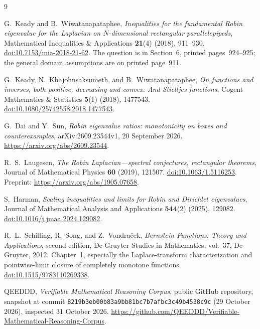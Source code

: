\documentclass[11pt,a4paper]{article}
\theoremstyle{definition}\newtheorem{definition}[theorem]{Definition}
\theoremstyle{remark}\newtheorem{remark}[theorem]{Remark}
\begin{document}
\begin{thebibliography}{9}

G.~Keady and B.~Wiwatanapataphee,
\emph{Inequalities for the fundamental Robin eigenvalue for the
Laplacian on $N$-dimensional rectangular parallelepipeds},
Mathematical Inequalities \& Applications \textbf{21}(4) (2018),
911--930.
\href{https://doi.org/10.7153/mia-2018-21-62}{doi:10.7153/mia-2018-21-62}.
The question is in Section~6, printed pages~924--925; the
general domain assumptions are on printed page~911.

G.~Keady, N.~Khajohnsaksumeth, and B.~Wiwatanapataphee,
\emph{On functions and inverses, both positive, decreasing and
convex: And Stieltjes functions},
Cogent Mathematics \& Statistics \textbf{5}(1) (2018), 1477543.
\href{https://doi.org/10.1080/25742558.2018.1477543}{doi:10.1080/25742558.2018.1477543}.

G.~Dai and Y.~Sun,
\emph{Robin eigenvalue ratios: monotonicity on boxes and counterexamples},
arXiv:2609.23544v1, 20 September 2026.
\url{https://arxiv.org/abs/2609.23544}.

R.~S.~Laugesen,
\emph{The Robin Laplacian---spectral conjectures, rectangular theorems},
Journal of Mathematical Physics \textbf{60} (2019), 121507.
\href{https://doi.org/10.1063/1.5116253}{doi:10.1063/1.5116253}.
Preprint: \url{https://arxiv.org/abs/1905.07658}.

S.~Harman,
\emph{Scaling inequalities and limits for Robin and Dirichlet eigenvalues},
Journal of Mathematical Analysis and Applications \textbf{544}(2)
(2025), 129082.
\href{https://doi.org/10.1016/j.jmaa.2024.129082}{doi:10.1016/j.jmaa.2024.129082}.

R.~L.~Schilling, R.~Song, and Z.~Vondra\v{c}ek,
\emph{Bernstein Functions: Theory and Applications}, second edition,
De Gruyter Studies in Mathematics, vol.~37, De Gruyter, 2012.
Chapter~1, especially the Laplace-transform characterization and
pointwise-limit closure of completely monotone functions.
\href{https://doi.org/10.1515/9783110269338}{doi:10.1515/9783110269338}.

QEEDDD,
\emph{Verifiable Mathematical Reasoning Corpus}, public GitHub repository,
snapshot at commit
\texttt{8219b3eb00b83a9bb81bc7b7afbc3c49b4538c9c}
(29 October 2026), inspected 31 October 2026.
\url{https://github.com/QEEDDD/Verifiable-Mathematical-Reasoning-Corpus}.

\end{thebibliography}
\end{document}
